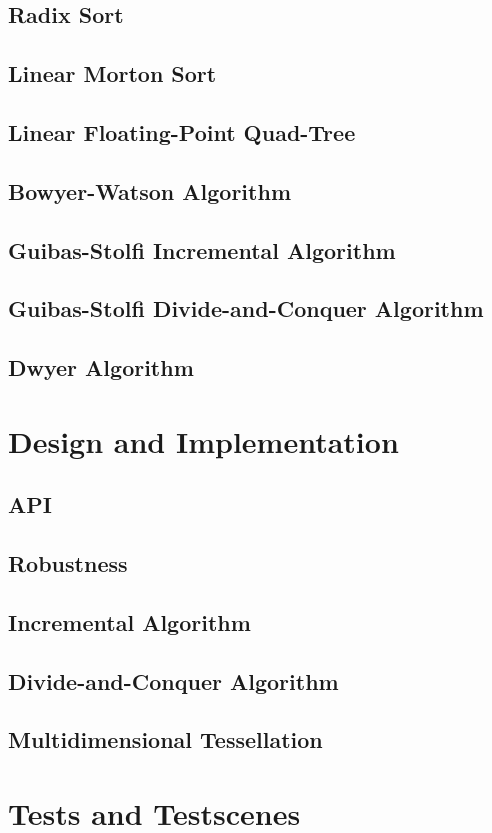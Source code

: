 \documentclass[10pt, twoside, fleqn]{article}
\let\oldsection\section
\renewcommand*\section{%
  \cleardoublepage
  \thispagestyle{sectionstyle}\oldsection}
\begin{document}
    \subsection{Radix Sort}
    \subsection{Linear Morton Sort}
    \subsection{Linear Floating-Point Quad-Tree}
    \subsection{Bowyer-Watson Algorithm}
    \subsection{Guibas-Stolfi Incremental Algorithm}
    \subsection{Guibas-Stolfi Divide-and-Conquer Algorithm}
    \subsection{Dwyer Algorithm}
  \section{Design and Implementation}
    \subsection{API}
    \subsection{Robustness}
    \subsection{Incremental Algorithm}
    \subsection{Divide-and-Conquer Algorithm}
    \subsection{Multidimensional Tessellation}
  \section{Tests and Testscenes}
\end{document}
